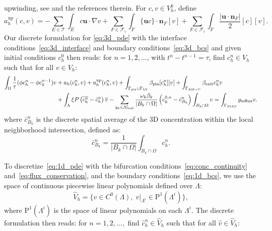 \documentclass[fleqn,10pt]{wlscirep}
\begin{document}
upwinding, see \cite[Section 2.3.1]{di2011mathematical} and the
references therein. For $c, v \in V_h^k$, define
\begin{equation}
  a_h^{\mathrm{up}}(c, v)
  = - \sum_{E \in \mathcal{T}} \int_E c\mathbf{u} \cdot \nabla v
  + \sum_{F \in \mathcal{F}_i } \int_F \{ \mathbf{u}  c\} \cdot \mathbf{n}_F [v] +
  \sum_{F \in \mathcal{F}_i} \int_F \frac{|\mathbf{u} \cdot \mathbf{n}_F|}{2} [c] [v] .
\end{equation}
Our discrete formulation for \eqref{eq:3d_pde} with the interface conditions~\eqref{eq:3d_interface} and boundary conditions~\eqref{eq:3d_bcs} and given initial conditions $c_h^0$ then reads: for $n = 1, 2, \dots$, with $t^n - t^{n-1} = \tau$, find $c_h^n \in V_h$ such that for all $v \in V_h$:
\begin{align} \label{eq:3d_dg_disc}
\begin{split}
    \int_{\Omega} \frac{1}{\tau} (\phi c_h^n - \phi c_h^{n-1}) v
  &+ a_h(c_h^n, v) + a_h^{\mathrm{up}}(c_h^n,v)
  + \int_{\Gamma_{\rm pia} \cup \Gamma_{\rm LV}} \beta_{\rm pia}[c_h^n][v] 
  + \int_{\Gamma_{\rm AM-U}} \beta_{\rm exit} c_h^n v \\
  &+ \int_{\Lambda} \xi  P \left (\overline{c_h^n} - \hat c_h^n \right) \overline{v} 
  - \sum_{y_k \in \mathcal{N}_{\rm leaf}} \frac{\omega_k \beta_k}{|B_k \cap \Omega|} \left(c_{k}^{0,n} - \bar{c}_{B_k}^n\right) \int_{B_k \cap \Omega} v
  =
  \int_{\Gamma_{\rm SSAS}} g_{\rm influx} v
  .
\end{split}
\end{align}
where $\bar{c}_{B_k}^n$ is the discrete spatial average of the 3D concentration within the local neighborhood intersection, defined as:
\begin{equation}
\bar{c}_{B_k}^n = \frac{1}{|B_k \cap \Omega|} \int_{B_k \cap \Omega} c_h^n .
\end{equation}

To discretize~\eqref{eq:1d_pde} with the bifurcation
conditions~\eqref{eq:conc_continuity}
and~\eqref{eq:flux_conservation}, and the boundary
conditions~\eqref{eq:1d_bcs}, we use the space of continuous piecewise
linear polynomials defined over $\Lambda$:
\begin{equation}
  \hat V_h
  = \{ v \in C^0(\Lambda), \; v \vert_{\Lambda^i} \in \mathrm{P}^1(\Lambda^i) \}, 
\end{equation}
where $\mathrm{P}^1(\Lambda^i)$ is the space of linear polynomials on each $\Lambda^i$. The discrete formulation then reads: for $n = 1,2,\ldots, $ find $\hat c_h^n \in \hat V_h$ such that for all $\hat v \in \hat V_h$:
\end{document}
